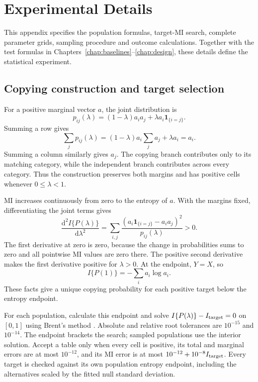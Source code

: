 \chapter{Experimental Details}
\label{app:construction}

This appendix specifies the population formulas, target-MI search, complete
parameter grids, sampling procedure and outcome calculations. Together with
the test formulas in Chapters~\ref{chap:baselines}--\ref{chap:design},
these details define the statistical experiment.

\section{Copying construction and target selection}

For a positive marginal vector \(a\), the joint distribution is
\begin{equation}
 p_{ij}(\lambda)=(1-\lambda)a_i a_j+\lambda a_i\mathbf{1}_{\{i=j\}}.
\end{equation}
Summing a row gives
\begin{equation}
 \sum_jp_{ij}(\lambda)
 =(1-\lambda)a_i\sum_ja_j+\lambda a_i=a_i.
\end{equation}
Summing a column similarly gives \(a_j\). The copying branch contributes
only to its matching category, while the independent branch contributes
across every category. Thus the construction preserves both margins and
has positive cells whenever \(0\leq\lambda<1\).

MI increases continuously from zero to the entropy of \(a\).
With the margins fixed, differentiating the joint terms gives
\begin{equation}
 \frac{\mathrm d^2 I\{P(\lambda)\}}{\mathrm d\lambda^2}
 =\sum_{i,j}\frac{(a_i\mathbf{1}_{\{i=j\}}-a_i a_j)^2}
                     {p_{ij}(\lambda)}>0.
\end{equation}
The first derivative at zero is zero, because the change in probabilities
sums to zero and all pointwise MI values are zero there. The positive
second derivative makes the first derivative positive for
\(\lambda>0\). At the endpoint, \(Y=X\), so
\begin{equation}
 I\{P(1)\}=-\sum_i a_i\log a_i.
\end{equation}
These facts give a unique copying probability for each positive target
below the entropy endpoint.

For each population, calculate this endpoint and solve
\(I\{P(\lambda)\}-I_{\rm target}=0\) on \([0,1]\) using Brent's
method \citep{brent1973}. Absolute and relative root tolerances are
\(10^{-15}\) and \(10^{-14}\). The endpoint brackets the search;
sampled populations use the interior solution. Accept a table only when
every cell is positive, its total and marginal errors are at most
\(10^{-12}\), and its MI error is at most
\(10^{-12}+10^{-8}I_{\rm target}\). Every target is checked against its own population entropy endpoint,
including the alternatives scaled by the fitted null standard deviation.

